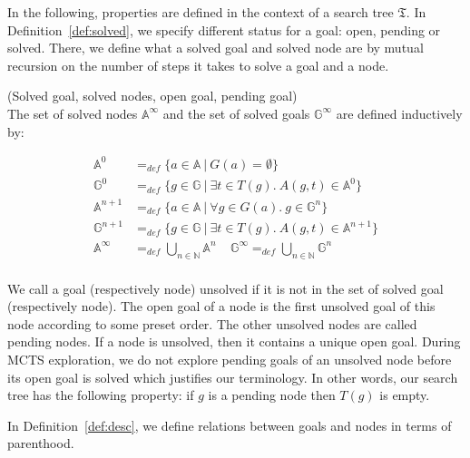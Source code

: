 \documentclass[runningheads,a4paper,draft]{svjour3}
\begin{document}
In the following, properties are defined in the context of a
search tree $\mathfrak{T}$. In Definition~\ref{def:solved}, we specify
different status for a goal: open, pending or solved. There, we define
what a solved goal and solved node are by mutual recursion on the number of
steps it takes to solve a goal and a node.
\begin{definition}\label{def:solved}(Solved goal, solved nodes, open goal,
pending goal)\\
The set of solved nodes $\mathbb{A}^\infty$ and
the set of solved goals $\mathbb{G}^\infty$ are defined inductively by:

\begin{align*}
\mathbb{A}^{0} &=_{def}
\lbrace a \in \mathbb{A}\ |\ G(a) = \emptyset \rbrace \\
\mathbb{G}^{0} &=_{def} \lbrace g \in \mathbb{G}\ |\
\exists t \in T(g).\ A(g,t) \in \mathbb{A}^{0} \rbrace\\
\mathbb{A}^{n+1} &=_{def} \lbrace a \in \mathbb{A}\ |\
\forall g \in G(a).\ g \in \mathbb{G}^{n} \rbrace\\
\mathbb{G}^{n+1} &=_{def} \lbrace g \in \mathbb{G}\ |\
\exists t \in T(g).\ A(g,t) \in \mathbb{A}^{n+1} \rbrace \\
\mathbb{A}^\infty &=_{def} \bigcup_{n \in \mathbb{N}} \mathbb{A}^n \ \ \ \ \
\mathbb{G}^\infty =_{def} \bigcup_{n \in \mathbb{N}} \mathbb{G}^n\\
\end{align*}

We call a goal (respectively node) unsolved if it is not in the set of solved
goal (respectively node).
The open goal of a node is the first unsolved goal of this node according to
some preset order. The other unsolved nodes are called pending nodes.
If a node is unsolved, then it contains a unique open goal.
During MCTS exploration, we do not explore pending goals of an unsolved node
before its open goal is solved which justifies our terminology. In other words,
our search tree has the following property: if $g$ is a pending node then
$T(g)$ is empty.

\end{definition}


In Definition~\ref{def:desc}, we define relations between goals
and nodes in terms of parenthood.
\end{document}
